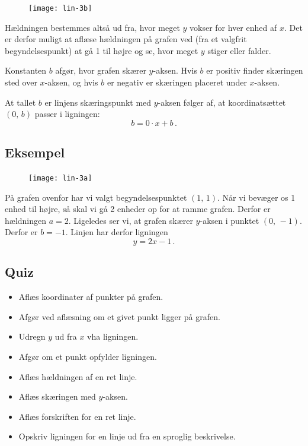 \documentclass[12pt,oneside,a4paper]{article}
\begin{document}
\begin{figure}[H]
    \centering
    \texttt{[image: lin-3b]}
    \caption{}
\end{figure}

Hældningen bestemmes altså ud fra, hvor meget $y$ vokser for hver enhed af $x$.
Det er derfor muligt at aflæse hældningen på grafen ved (fra et valgfrit
begyndelsespunkt) at gå 1 til højre og se, hvor meget $y$ stiger eller falder.

Konstanten $b$ afgør, hvor grafen skærer $y$-aksen. Hvis $b$ er positiv finder
skæringen sted over $x$-aksen, og hvis $b$ er negativ er skæringen placeret
under $x$-aksen.

At tallet $b$ er linjens skæringspunkt med $y$-aksen følger af, at
koordinatsættet $(0,\,b)$ passer i ligningen:
$$
b = 0\cdot x+b \,.
$$


\subsection{Eksempel}
\begin{figure}[H]
    \centering
    \texttt{[image: lin-3a]}
    \caption{}
\end{figure}

På grafen ovenfor har vi valgt begyndelsespunktet $(1,\,1)$. Når vi bevæger os
1 enhed til højre, så skal vi gå 2 enheder op for at ramme grafen. Derfor er
hældningen $a=2$.  Ligeledes ser vi, at grafen skærer $y$-aksen i punktet
$(0,\,-1)$. Derfor er $b=-1$.  Linjen har derfor ligningen
\[
    y=2x-1\,.
\]


%


\subsection{Quiz}
\begin{itemize}
    \item Aflæs koordinater af punkter på grafen.
    \item Afgør ved aflæsning om et givet punkt ligger på grafen.
    \item Udregn $y$ ud fra $x$ vha ligningen.
    \item Afgør om et punkt opfylder ligningen.
    \item Aflæs hældningen af en ret linje.
    \item Aflæs skæringen med $y$-aksen.
    \item Aflæs forskriften for en ret linje.
    \item Opskriv ligningen for en linje ud fra en sproglig beskrivelse.
\end{itemize}
\end{document}
